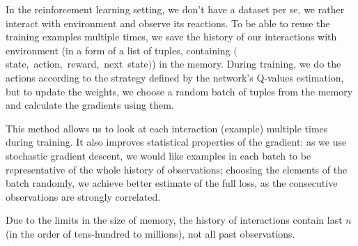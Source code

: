 In the reinforcement learning setting, we don't have a dataset per se, we rather interact with environment and observe its reactions. To be able to reuse the training examples multiple times, we save the history of our interactions with environment (in a form of a list of tuples, containing $($state,~action,~reward,~next~state$)$) in the memory. During training, we do the actions according to the strategy defined by the network's Q-values estimation, but to update the weights, we choose a random batch of tuples from the memory and calculate the gradients using them.

This method allows us to look at each interaction (example) multiple times during training. It also improves statistical properties of the gradient: as we use stochastic gradient descent, we would like examples in each batch to be representative of the whole history of observations; choosing the elements of the batch randomly, we achieve better estimate of the full loss, as the consecutive observations are strongly correlated.

Due to the limits in the size of memory, the history of interactions contain last $n$ (in the order of tens-hundred to millions), not all past observations.
